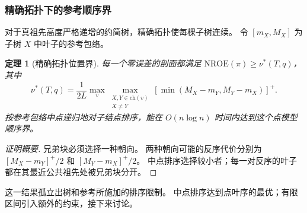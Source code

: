 \documentclass[fontset=none,zihao=5,a4paper]{ctexart}
\newtheorem{theorem}{定理}
\newcommand{\nroe}{\mathrm{NROE}}
\begin{document}
\subsubsection{精确拓扑下的参考顺序界}
对于真祖先高度严格递增的约简树，精确拓扑使每棵子树连续。
令 $[m_X,M_X]$ 为子树 $X$ 中叶子的参考包络。
\begin{theorem}[精确拓扑位置界]\label{thm:order}
每一个零误差的剖面都满足 $\nroe(\pi)\ge\nu^*(T,q)$，其中
\begin{equation}\label{eq:nu}
 \nu^*(T,q)=\frac{1}{2L}\max_v\max_{\substack{X,Y\in\mathrm{ch}(v)\\X\ne Y}}
 [\min(M_X-m_Y,M_Y-m_X)]^+.
\end{equation}
按参考包络中点递归地对子结点排序，能在 $O(n\log n)$ 时间内达到这个点模型顺序界。
\end{theorem}
\begin{proof}[证明概要]
兄弟块必须选择一种朝向。
两种朝向可能的反序代价分别为 $[M_X-m_Y]^+/2$ 和 $[M_Y-m_X]^+/2$。
中点排序选择较小者；每一对反序的叶子都在其最近公共祖先处被兄弟块分开。
\end{proof}
这一结果孤立出树和参考所施加的排序限制。
中点排序达到点叶序的最优；有限区间引入额外的约束，接下来讨论。
\end{document}
